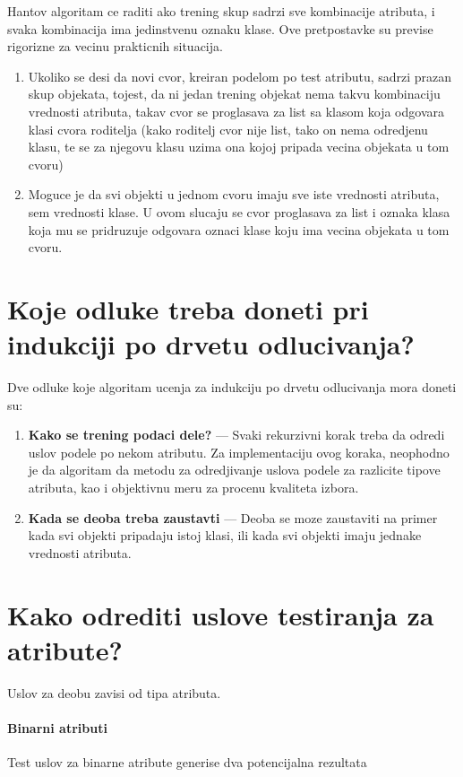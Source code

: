 \documentclass[a4paper]{article}
\begin{document}
Hantov algoritam ce raditi ako trening skup sadrzi sve kombinacije atributa, i svaka kombinacija ima
jedinstvenu oznaku klase. Ove pretpostavke su previse rigorizne za vecinu prakticnih situacija.
\begin{enumerate}
    \item Ukoliko se desi da novi cvor, kreiran podelom po test atributu, sadrzi prazan skup
        objekata, tojest, da ni jedan trening objekat nema takvu kombinaciju vrednosti atributa,
        takav cvor se proglasava za list sa klasom koja odgovara klasi cvora roditelja (kako
        roditelj cvor nije list, tako on nema odredjenu klasu, te se za njegovu klasu uzima ona
        kojoj pripada vecina objekata u tom cvoru)
    \item Moguce je da svi objekti u jednom cvoru imaju sve iste vrednosti atributa, sem vrednosti
        klase. U ovom slucaju se cvor proglasava za list i oznaka klasa koja mu se pridruzuje
        odgovara oznaci klase koju ima vecina objekata u tom cvoru.
\end{enumerate}

\section{Koje odluke treba doneti pri indukciji po drvetu odlucivanja?}
Dve odluke koje algoritam ucenja za indukciju po drvetu odlucivanja mora doneti su:
\begin{enumerate}
    \item \textbf{Kako se trening podaci dele?} --- Svaki rekurzivni korak treba da odredi uslov
        podele po nekom atributu. Za implementaciju ovog koraka, neophodno je da algoritam da metodu
        za odredjivanje uslova podele za razlicite tipove atributa, kao i objektivnu meru za procenu
        kvaliteta izbora.
    \item \textbf{Kada se deoba treba zaustavti} --- Deoba se moze zaustaviti na primer kada svi
        objekti pripadaju istoj klasi, ili kada svi objekti imaju jednake vrednosti atributa.
\end{enumerate}

\section{Kako odrediti uslove testiranja za atribute?}
Uslov za deobu zavisi od tipa atributa.

\paragraph{Binarni atributi} Test uslov za binarne atribute generise dva potencijalna rezultata
\end{document}
